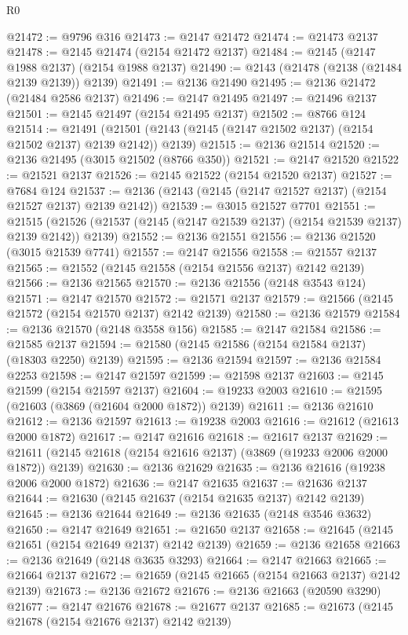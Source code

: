 \begin{lexlean}{R0}
\begin{coremodule}
@21472 := @9796 @316
@21473 := @2147 @21472
@21474 := @21473 @2137
@21478 := @2145 @21474 (@2154 @21472 @2137)
@21484 := @2145 (@2147 @1988 @2137) (@2154 @1988 @2137)
@21490 := @2143 (@21478 (@2138 (@21484 @2139 @2139)) @2139)
@21491 := @2136 @21490
@21495 := @2136 @21472 (@21484 @2586 @2137)
@21496 := @2147 @21495
@21497 := @21496 @2137
@21501 := @2145 @21497 (@2154 @21495 @2137)
@21502 := @8766 @124
@21514 := @21491
    (@21501 (@2143 (@2145 (@2147 @21502 @2137) (@2154 @21502 @2137) @2139 @2142)) @2139)
@21515 := @2136 @21514
@21520 := @2136 @21495 (@3015 @21502 (@8766 @350))
@21521 := @2147 @21520
@21522 := @21521 @2137
@21526 := @2145 @21522 (@2154 @21520 @2137)
@21527 := @7684 @124
@21537 := @2136 (@2143 (@2145 (@2147 @21527 @2137) (@2154 @21527 @2137) @2139 @2142))
@21539 := @3015 @21527 @7701
@21551 := @21515
    (@21526 (@21537 (@2145 (@2147 @21539 @2137) (@2154 @21539 @2137) @2139 @2142)) @2139)
@21552 := @2136 @21551
@21556 := @2136 @21520 (@3015 @21539 @7741)
@21557 := @2147 @21556
@21558 := @21557 @2137
@21565 := @21552 (@2145 @21558 (@2154 @21556 @2137) @2142 @2139)
@21566 := @2136 @21565
@21570 := @2136 @21556 (@2148 @3543 @124)
@21571 := @2147 @21570
@21572 := @21571 @2137
@21579 := @21566 (@2145 @21572 (@2154 @21570 @2137) @2142 @2139)
@21580 := @2136 @21579
@21584 := @2136 @21570 (@2148 @3558 @156)
@21585 := @2147 @21584
@21586 := @21585 @2137
@21594 := @21580 (@2145 @21586 (@2154 @21584 @2137) (@18303 @2250) @2139)
@21595 := @2136 @21594
@21597 := @2136 @21584 @2253
@21598 := @2147 @21597
@21599 := @21598 @2137
@21603 := @2145 @21599 (@2154 @21597 @2137)
@21604 := @19233 @2003
@21610 := @21595 (@21603 (@3869 (@21604 @2000 @1872)) @2139)
@21611 := @2136 @21610
@21612 := @2136 @21597
@21613 := @19238 @2003
@21616 := @21612 (@21613 @2000 @1872)
@21617 := @2147 @21616
@21618 := @21617 @2137
@21629 := @21611 (@2145 @21618 (@2154 @21616 @2137) (@3869 (@19233 @2006 @2000 @1872)) @2139)
@21630 := @2136 @21629
@21635 := @2136 @21616 (@19238 @2006 @2000 @1872)
@21636 := @2147 @21635
@21637 := @21636 @2137
@21644 := @21630 (@2145 @21637 (@2154 @21635 @2137) @2142 @2139)
@21645 := @2136 @21644
@21649 := @2136 @21635 (@2148 @3546 @3632)
@21650 := @2147 @21649
@21651 := @21650 @2137
@21658 := @21645 (@2145 @21651 (@2154 @21649 @2137) @2142 @2139)
@21659 := @2136 @21658
@21663 := @2136 @21649 (@2148 @3635 @3293)
@21664 := @2147 @21663
@21665 := @21664 @2137
@21672 := @21659 (@2145 @21665 (@2154 @21663 @2137) @2142 @2139)
@21673 := @2136 @21672
@21676 := @2136 @21663 (@20590 @3290)
@21677 := @2147 @21676
@21678 := @21677 @2137
@21685 := @21673 (@2145 @21678 (@2154 @21676 @2137) @2142 @2139)

\end{coremodule}
\end{lexlean}
